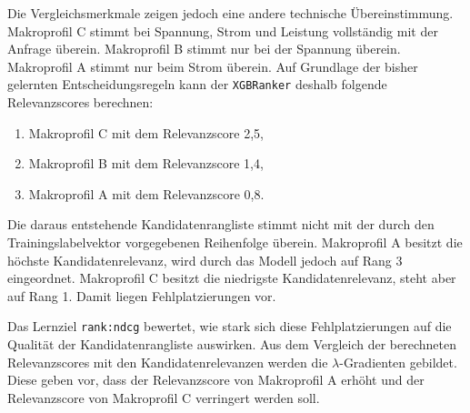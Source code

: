 Die Vergleichsmerkmale zeigen jedoch eine andere technische Übereinstimmung. Makroprofil C stimmt bei Spannung, Strom und Leistung vollständig mit der Anfrage überein. Makroprofil B stimmt nur bei der Spannung überein. 
Makroprofil A stimmt nur beim Strom überein. Auf Grundlage der bisher gelernten Entscheidungsregeln kann der \texttt{XGBRanker} deshalb folgende Relevanzscores berechnen: 

\begin{enumerate} 
    \item Makroprofil C mit dem Relevanzscore 2,5, 
    \item Makroprofil B mit dem Relevanzscore 1,4, 
    \item Makroprofil A mit dem Relevanzscore 0,8. 
\end{enumerate}

Die daraus entstehende Kandidatenrangliste stimmt nicht mit der durch den Trainingslabelvektor vorgegebenen Reihenfolge überein. 
Makroprofil A besitzt die höchste Kandidatenrelevanz, wird durch das Modell jedoch auf Rang 3 eingeordnet. Makroprofil C besitzt die niedrigste Kandidatenrelevanz, steht aber auf Rang 1. Damit liegen Fehlplatzierungen vor.

Das Lernziel \texttt{rank:ndcg} bewertet, wie stark sich diese Fehlplatzierungen auf die Qualität der Kandidatenrangliste auswirken. Aus dem Vergleich der berechneten Relevanzscores mit den Kandidatenrelevanzen werden die $\lambda$-Gradienten gebildet. 
Diese geben vor, dass der Relevanzscore von Makroprofil A erhöht und der Relevanzscore von Makroprofil C verringert werden soll. 

